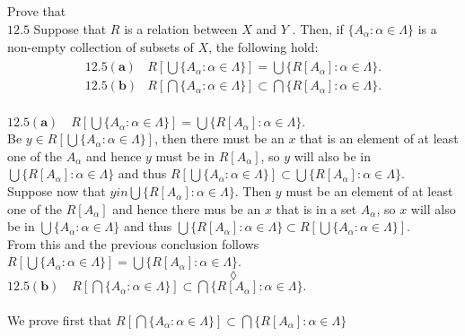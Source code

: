 \subsection{}
\begin{tcolorbox}
Prove that \\
$\mathbf{12.5}$ Suppose that $R$ is a relation between $X$ and $Y$ . Then, if $\{A_{\alpha}:\alpha \in \Lambda\}$ is a non-empty collection of subsets of $X$, the following hold:
\begin{align*}
\begin{array}{ll}
\mathbf{12.5(a)}&R\left[\bigcup\{A_{\alpha}:\alpha \in \Lambda\}\right]= \bigcup\{R[A_{\alpha}]:\alpha \in \Lambda\}. \\
\mathbf{12.5(b)}&R\left[\bigcap\{A_{\alpha}:\alpha \in \Lambda\}\right]\subset \bigcap\{R[A_{\alpha}]:\alpha \in \Lambda\}. \\
\end{array}
\end{align*}
\end{tcolorbox}
$\mathbf{12.5(a)}\quad R\left[\bigcup\{A_{\alpha}:\alpha \in \Lambda\}\right]= \bigcup\{R[A_{\alpha}]:\alpha \in \Lambda\}. $\\
Be $y \in R\left[\bigcup\{A_{\alpha}:\alpha \in \Lambda\}\right]$, then there must be an $x$ that is an element of at least one of the $A_{\alpha}$ and hence $y$ must be in $R[A_{\alpha}]$, so $y$ will also be in $\bigcup\{R[A_{\alpha}]:\alpha \in \Lambda\}$ and thus $R\left[\bigcup\{A_{\alpha}:\alpha \in \Lambda\}\right]\subset \bigcup\{R[A_{\alpha}]:\alpha \in \Lambda\}$.\\
Suppose now that $yin \bigcup\{R[A_{\alpha}]:\alpha \in \Lambda\}$. Then $y$ must be  an element of at least one of the $R[A_{\alpha}]$ and hence there mus be an $x$ that is in a set $A_{\alpha}$, so $x$ will also be in $\bigcup\{A_{\alpha}:\alpha \in \Lambda\}$ and thus $\bigcup\{R[A_{\alpha}]:\alpha \in \Lambda\}\subset R\left[\bigcup\{A_{\alpha}:\alpha \in \Lambda\}\right]$.\\
From this and the previous conclusion follows $R\left[\bigcup\{A_{\alpha}:\alpha \in \Lambda\}\right]= \bigcup\{R[A_{\alpha}]:\alpha \in \Lambda\}$.
$$\lozenge$$
$\mathbf{12.5(b)}\quad R\left[\bigcap\{A_{\alpha}:\alpha \in \Lambda\}\right]\subset \bigcap\{R[A_{\alpha}]:\alpha \in \Lambda\}. $\\\\
We prove first that  $R\left[\bigcap\{A_{\alpha}:\alpha \in \Lambda\}\right]\subset \bigcap\{R[A_{\alpha}]:\alpha \in \Lambda\}$\\
